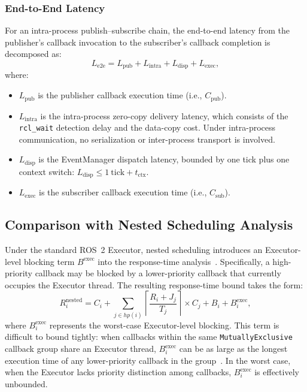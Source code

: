 \subsubsection{End-to-End Latency}

For an intra-process publish--subscribe chain, the end-to-end latency from the publisher's callback invocation to the subscriber's callback completion is decomposed as:
\begin{equation}
    L_{\mathrm{e2e}} = L_{\mathrm{pub}} + L_{\mathrm{intra}} + L_{\mathrm{disp}} + L_{\mathrm{exec}},
    \label{eq:e2e}
\end{equation}
where:
\begin{itemize}
    \item $L_{\mathrm{pub}}$ is the publisher callback execution time (i.e., $C_{\mathrm{pub}}$).
    \item $L_{\mathrm{intra}}$ is the intra-process zero-copy delivery latency, which consists of the \texttt{rcl\_wait} detection delay and the data-copy cost. Under intra-process communication, no serialization or inter-process transport is involved.
    \item $L_{\mathrm{disp}}$ is the EventManager dispatch latency, bounded by one tick plus one context switch: $L_{\mathrm{disp}} \leqslant 1~\text{tick} + t_{\mathrm{ctx}}$.
    \item $L_{\mathrm{exec}}$ is the subscriber callback execution time (i.e., $C_{\mathrm{sub}}$).
\end{itemize}

\subsection{Comparison with Nested Scheduling Analysis}

Under the standard ROS~2 Executor, nested scheduling introduces an Executor-level blocking term $B^{\mathrm{exec}}$ into the response-time analysis~\cite{casini2019rtas,tang2020rtss,blass2021rtss,jiang2022rtss}.
Specifically, a high-priority callback may be blocked by a lower-priority callback that currently occupies the Executor thread.
The resulting response-time bound takes the form:
\begin{equation}
    R_i^{\mathrm{nested}} = C_i + \sum_{j \in hp(i)} \left\lceil \frac{R_i + J_j}{T_j} \right\rceil \times C_j + B_i + B_i^{\mathrm{exec}},
    \label{eq:rta-nested}
\end{equation}
where $B_i^{\mathrm{exec}}$ represents the worst-case Executor-level blocking.
This term is difficult to bound tightly: when callbacks within the same \texttt{MutuallyExclusive} callback group share an Executor thread, $B_i^{\mathrm{exec}}$ can be as large as the longest execution time of any lower-priority callback in the group~\cite{casini2019rtas}.
In the worst case, when the Executor lacks priority distinction among callbacks, $B_i^{\mathrm{exec}}$ is effectively unbounded.

